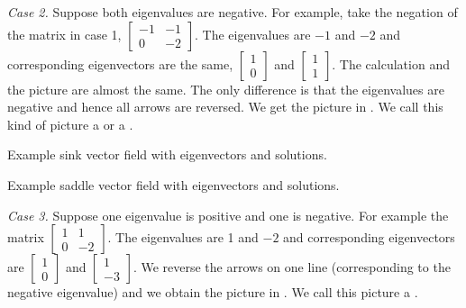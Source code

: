 \medskip

\emph{Case 2.} Suppose both eigenvalues are negative.  For example, take
the
negation of the matrix in case 1,
$\left[ \begin{smallmatrix} -1 & -1 \\ 0 & -2 \end{smallmatrix} \right]$.
The eigenvalues are $-1$ and $-2$ and corresponding eigenvectors are
the same,
$\left[ \begin{smallmatrix} 1 \\ 0 \end{smallmatrix} \right]$ and
$\left[ \begin{smallmatrix} 1 \\ 1 \end{smallmatrix} \right]$.  The
calculation and the picture are almost the same.  The only difference is that
the eigenvalues are negative and hence all arrows are reversed.  We get the
picture in .  We call this kind of picture a
\emph{} or a \emph{}.

\begin{myfig}
\parbox[t]{3.0in}{
 \capstart
 \caption{Example sink vector field with eigenvectors and
 solutions.\label{pln:sink-fullfig}}
}
\quad
\parbox[t]{3.0in}{
 \capstart
 \caption{Example saddle vector field with eigenvectors and
 solutions.\label{pln:saddle-fullfig}}
}
\end{myfig}

\medskip

\emph{Case 3.} Suppose one eigenvalue is positive and one is negative.
For example the matrix
$\left[ \begin{smallmatrix} 1 & 1 \\ 0 & -2 \end{smallmatrix} \right]$.
The eigenvalues are 1 and $-2$ and corresponding eigenvectors are
$\left[ \begin{smallmatrix} 1 \\ 0 \end{smallmatrix} \right]$ and
$\left[ \begin{smallmatrix} 1 \\ -3 \end{smallmatrix} \right]$.  We reverse
the arrows on one line (corresponding to the negative eigenvalue) and we
obtain the picture in .  We call this picture a
\emph{}.


